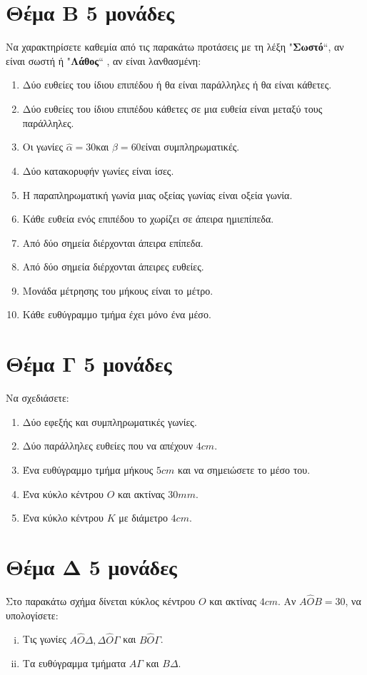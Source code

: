\documentclass[a4paper,11pt]{report}
\begin{document}
\section*{Θέμα Β \hfill \small{5 μονάδες}}
Να χαρακτηρίσετε καθεμία από τις παρακάτω προτάσεις με τη λέξη "\textbf{Σωστό}``, αν είναι σωστή ή  
"\textbf{Λάθος}`` , αν είναι λανθασμένη:
\begin{enumerate}[1)]
 \item Δύο ευθείες του ίδιου επιπέδου ή θα είναι παράλληλες ή θα είναι κάθετες.
 \item Δύο ευθείες του ίδιου επιπέδου κάθετες σε μια ευθεία είναι μεταξύ τους παράλληλες.
 \item Οι γωνίες $\hat{α}=30$\textdegree και $\hat{β}=60$\textdegree είναι συμπληρωματικές.
 \item Δύο κατακορυφήν γωνίες είναι ίσες.
 \item Η παραπληρωματική γωνία μιας οξείας γωνίας είναι οξεία γωνία.
 \item Κάθε ευθεία ενός επιπέδου το χωρίζει σε άπειρα ημιεπίπεδα.
 \item Από δύο σημεία διέρχονται άπειρα επίπεδα.
 \item Από δύο σημεία διέρχονται άπειρες ευθείες.
 \item Μονάδα μέτρησης του μήκους είναι το μέτρο.
 \item Κάθε ευθύγραμμο τμήμα έχει μόνο ένα μέσο.
\end{enumerate}


\section*{Θέμα Γ \hfill \small{5 μονάδες}}
Να σχεδιάσετε: 
\begin{enumerate}[1)]
 \item Δύο εφεξής και συμπληρωματικές γωνίες.
 \item Δύο παράλληλες ευθείες που να απέχουν $4cm$.
 \item Ένα ευθύγραμμο τμήμα μήκους $5cm$ και να σημειώσετε το μέσο του.
 \item Ένα κύκλο κέντρου $Ο$ και ακτίνας $30mm$.
 \item Ένα κύκλο κέντρου $Κ$ με διάμετρο $4cm$.
\end{enumerate}


\newpage
\section*{Θέμα Δ \hfill \small{5 μονάδες}}
Στο παρακάτω σχήμα δίνεται κύκλος κέντρου $Ο$ και ακτίνας $4cm$. Αν $Α\hat{Ο}Β=30$\textdegree, 
να υπολογίσετε:
\begin{enumerate}[i)]
 \item Τις γωνίες $Α\hat{Ο}Δ, Δ\hat{Ο}Γ$ και $Β\hat{Ο}Γ$.
 \item Τα ευθύγραμμα τμήματα $ΑΓ$ και $ΒΔ$.
\end{enumerate}
\end{document}
